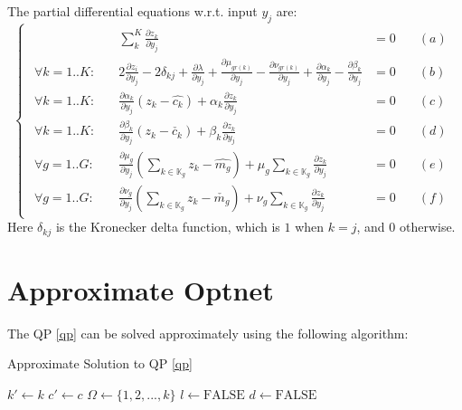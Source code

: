 \documentclass[11 pt]{article}
\begin{document}
The partial differential equations w.r.t. input $y_j$ are:
\begin{equation}\label{eqns_nested_wrt_y_j}
    \begin{cases}
        \begin{aligned}
            & \sum_k^K \frac{\partial z_k}{\partial y_j} & = 0 &\quad (a)\\
            
            \forall k=1..K : \quad & 2\frac{\partial z_i}{\partial y_j} - 2\delta_{kj} + \frac{\partial \lambda}{\partial y_j} + \frac{\partial \mu_{gr(k)}}{\partial y_j} - \frac{\partial \nu_{gr(k)}}{\partial y_j} + \frac{\partial \alpha_k}{\partial y_j} - \frac{\partial \beta_k}{\partial y_j} & = 0 &\quad (b)\\
            
            \forall k=1..K : \quad & \frac{\partial \alpha_k}{\partial y_j}(z_k - \hat{c_k}) + \alpha_k \frac{\partial z_k}{\partial y_j} & = 0 &\quad (c)\\
            
            \forall k=1..K : \quad & \frac{\partial \beta_k}{\partial y_j}(z_k - \check{c_k}) + \beta_k \frac{\partial z_k}{\partial y_j}& = 0 &\quad (d) \\

            \forall g=1..G : \quad & \frac{\partial \mu_g}{\partial y_j}(\sum_{k \in \mathbb{K}_g} z_{k} - \hat{m_{g}}) + \mu_g \sum_{k \in \mathbb{K}_g} \frac{\partial z_k}{\partial y_j}& = 0 &\quad (e) \\

            \forall g=1..G : \quad & \frac{\partial \nu_g}{\partial y_j}(\sum_{k \in \mathbb{K}_g} z_{k} - \check{m_{g}}) + \nu_g \sum_{k \in \mathbb{K}_g} \frac{\partial z_k}{\partial y_j}& = 0 &\quad (f)
        \end{aligned}
    \end{cases}
\end{equation}
Here $\delta_{kj}$ is the Kronecker delta function, which is $1$ when $k=j$, and $0$ otherwise.


\section{Approximate Optnet}
The QP \ref{qp} can be solved approximately using the following algorithm:

\begin{algorithm} \label{algo_apprx_qp}
    \caption{Approximate Solution to QP \ref{qp}}
    \begin{algorithmic}[1]
        \State $k' \gets k$
        \State $c' \gets c$
        \State $\Omega \gets \{1,2,...,k\}$
        \State $l \gets \text{FALSE}$
        \State $d \gets \text{FALSE}$
    \end{algorithmic}
\end{algorithm}
\end{document}
